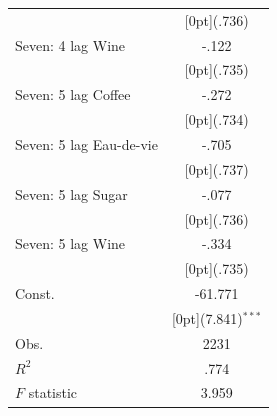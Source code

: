 \documentclass[12pt,a4paper,titlepage]{article}
\begin{document}
{\begin{tabular*}{\textwidth}{@{\extracolsep{\fill}}lc}
&	\raisebox{.7ex}[0pt]{\scriptsize (.736)} \\
Seven: 4 lag Wine &	-.122 \\
&	\raisebox{.7ex}[0pt]{\scriptsize (.735)} \\
Seven: 5 lag Coffee &	-.272 \\
&	\raisebox{.7ex}[0pt]{\scriptsize (.734)} \\
Seven: 5 lag Eau-de-vie &	-.705 \\
&	\raisebox{.7ex}[0pt]{\scriptsize (.737)} \\
Seven: 5 lag Sugar &	-.077 \\
&	\raisebox{.7ex}[0pt]{\scriptsize (.736)} \\
Seven: 5 lag Wine &	-.334 \\
&	\raisebox{.7ex}[0pt]{\scriptsize (.735)} \\
Const. &	-61.771 \\
&	\raisebox{.7ex}[0pt]{\scriptsize (7.841)$^{***}$} \\
Obs. &	2231 \\
$ R^2$ &	.774 \\
$ F$ statistic &	3.959 \\
\hline\hline	
\end{tabular*}%

}
\end{document}
